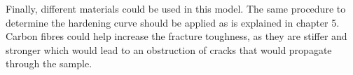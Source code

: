 Finally, different materials could be used in this model. The same procedure to determine the hardening curve should be applied as is explained in chapter 5. Carbon fibres could help increase the fracture toughness, as they are stiffer and stronger which would lead to an obstruction of cracks that would propagate through the sample.



